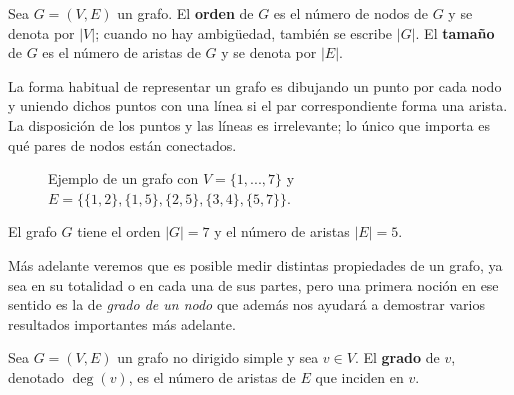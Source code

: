         \begin{definicion}
            Sea $G=(V,E)$ un grafo. El \textbf{orden} de $G$ es el número de nodos de $G$ y se denota por $|V|$; cuando no hay ambigüedad, también se escribe $|G|$. El \textbf{tamaño} de $G$ es el número de aristas de $G$ y se denota por $|E|$.
        \end{definicion}

        \begin{ejemplo}
            La forma habitual de representar un grafo es dibujando un punto por cada nodo y uniendo dichos puntos con una línea si el par correspondiente forma una arista. La disposición de los puntos y las líneas es irrelevante; lo único que importa es qué pares de nodos están conectados.

            \begin{figure}[ht]
                \centering
                \caption{Ejemplo de un grafo con $V=\{1, ..., 7\}$ y $E=\{\{1,2\}, \{1,5\}, \{2,5\}, \{3,4\}, \{5,7\}\}$.}
                \label{fig:ejemplo-grafo}
            \end{figure}


            El grafo $G$ tiene el orden $|G|=7$ y el número de aristas $|E| = 5$.
        \end{ejemplo}
        Más adelante veremos que es posible medir distintas propiedades de un grafo, ya sea en su totalidad o en cada una de sus partes, pero una primera noción en ese sentido es la de \textit{grado de un nodo} que además nos ayudará a demostrar varios resultados importantes más adelante.
        \begin{definicion}
            Sea $G=(V,E)$ un grafo no dirigido simple y sea $v\in V$. El \textbf{grado} de $v$, denotado $\deg(v)$, es el número de aristas de $E$ que inciden en $v$.
        \end{definicion}

